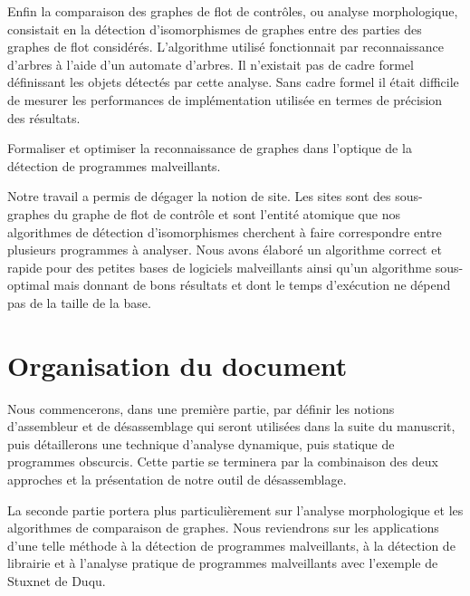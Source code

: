 Enfin la comparaison des graphes de flot de contrôles, ou analyse morphologique, consistait en la détection d'isomorphismes de graphes entre des parties des graphes de flot considérés. L'algorithme utilisé fonctionnait par reconnaissance d'arbres à l'aide d'un automate d'arbres. Il n'existait pas de cadre formel définissant les objets détectés par cette analyse. Sans cadre formel il était difficile de mesurer les performances de implémentation utilisée en termes de précision des résultats.

\begin{pb}
 Formaliser et optimiser la reconnaissance de graphes dans l'optique de la détection de programmes malveillants.
\end{pb}

Notre travail a permis de dégager la notion de site. Les sites sont des sous-graphes du graphe de flot de contrôle et sont l'entité atomique que nos algorithmes de détection d'isomorphismes cherchent à faire correspondre entre plusieurs programmes à analyser. Nous avons élaboré un algorithme correct et rapide pour des petites bases de logiciels malveillants ainsi qu'un algorithme sous-optimal mais donnant de bons résultats et dont le temps d'exécution ne dépend pas de la taille de la base.

\section{Organisation du document}

Nous commencerons, dans une première partie, par définir les notions d'assembleur et de désassemblage qui seront utilisées dans la suite du manuscrit, puis détaillerons une technique d'analyse dynamique, puis statique de programmes obscurcis. Cette partie se terminera par la combinaison des deux approches et la présentation de notre outil de désassemblage.

La seconde partie portera plus particulièrement sur l'analyse morphologique et les algorithmes de comparaison de graphes. Nous reviendrons sur les applications d'une telle méthode à la détection de programmes malveillants, à la détection de librairie et à l'analyse pratique de programmes malveillants avec l'exemple de Stuxnet de Duqu.